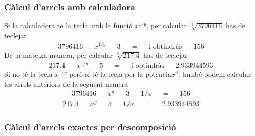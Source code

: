 \subsubsection{Càlcul d’arrels amb calculadora}

Si la calculadora té la tecla amb la funció $x^{1/y}$, per calcular 
$\sqrt[3]{3796416}$ has de teclejar%
\begin{equation*}
\begin{array}{ccccccccccc}
3796416 &  & x^{1/y} &  & 3 &  & = &  & \text{i obtindràs} &  & 156%
\end{array}%
\end{equation*}%
De la mateixa manera, per calcular $\sqrt[5]{217.4}$ has de teclejar 
\begin{equation*}
\begin{array}{ccccccccccc}
217.4 &  & x^{1/y} &  & 5 &  & = &  & \text{i obtindràs} &  & 2.933944593%
\end{array}%
\end{equation*}%
Si no té la tecla $x^{1/y}$ però sí té la tecla per la potència$%
x^{y}$, també podem calcular les arrels anteriors de la
següent manera%
\begin{equation*}
\begin{array}{ccccccccccc}
3796416 &  & x^{y} &  & 3 &  & 1/x &  & = &  & 156%
\end{array}%
\end{equation*}%
\begin{equation*}
\begin{array}{ccccccccccc}
217.4 &  & x^{y} &  & 5 &  & 1/x &  & = &  & 2.933944593%
\end{array}%
\end{equation*}

\subsubsection{Càlcul d’arrels exactes per descomposició}

